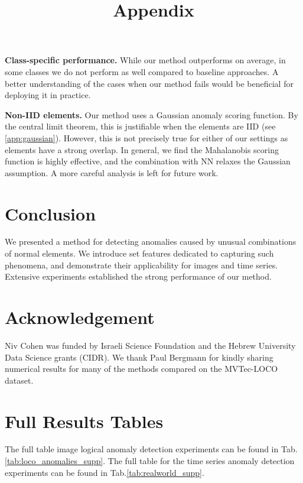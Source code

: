 \documentclass{article}
\begin{document}
\textbf{Class-specific performance.} While our method outperforms on average, in some classes we do not perform as well compared to baseline approaches. A better understanding of the cases when our method fails would be beneficial for deploying it in practice.

\textbf{Non-IID elements.} Our method uses a Gaussian anomaly scoring function. By the central limit theorem, this is justifiable when the elements are IID (see \cref{app:gaussian}). However, this is not precisely true for either of our settings as elements have a strong overlap. In general, we find the Mahalanobis scoring function is highly effective, and the combination with NN relaxes the Gaussian assumption. A more careful analysis is left for future work.

\section{Conclusion}

We presented a method for detecting anomalies caused by unusual combinations of normal elements. We introduce set features dedicated to capturing such phenomena, and demonstrate their applicability for images and time series. Extensive experiments established the strong performance of our method.

\section{Acknowledgement}
Niv Cohen was funded by Israeli Science Foundation and the Hebrew University Data Science grants (CIDR). We thank Paul Bergmann for kindly sharing numerical results for many of the methods compared on the MVTec-LOCO dataset. 






\clearpage

\appendix

 \title{Appendix}

\section{Full Results Tables}
\label{app:full_results}
The full table image logical anomaly detection experiments can be found in Tab.\ref{tab:loco_anomalies_supp}.
The full table for the time series anomaly detection experiments can be found in Tab.\ref{tab:realworld_supp}.
\end{document}
